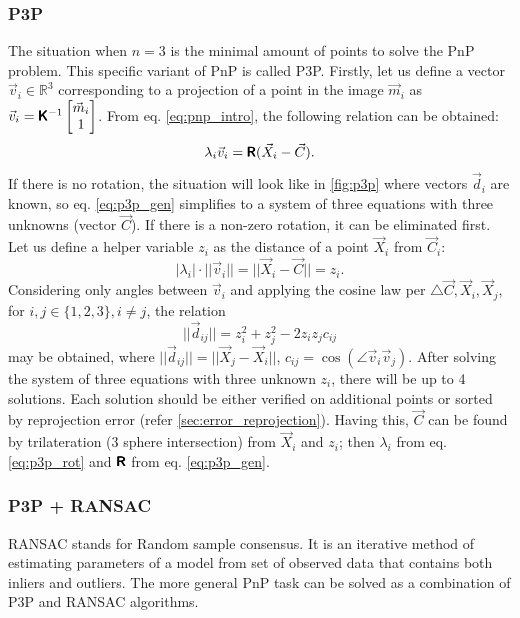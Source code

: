 \subsubsection{P3P}
The situation when $n=3$ is the minimal amount of points to solve the PnP problem.
This specific variant of PnP is called P3P.  
Firstly, let us define a vector $\vec{v}_i \in \mathbb{R}^3$ corresponding to a projection of a point in the image $\vec{m}_i$ as $\vec{v}_i = \pmb{\mathsf{K}}^{-1}\begin{bmatrix}\vec{m}_i \\ 1 \end{bmatrix}$. From eq. \eqref{eq:pnp_intro}, the following relation can be obtained:
\begin{equation}
    \label{eq:p3p_gen}
    \lambda_i \vec{v}_i = \pmb{\mathsf{R}} (\vec{X}_i - \vec{C}).
\end{equation}
If there is no rotation, the situation will look like in \autoref{fig:p3p} where vectors $\vec{d}_i$ are known, so eq. \eqref{eq:p3p_gen} simplifies to a system of three equations with three unknowns (vector $\vec{C}$).
If there is a non-zero rotation, it can be eliminated first.
Let us define a helper variable $z_i$ as the distance of a point $\vec{X}_i$ from $\vec{C}_i$:
\begin{equation}
    \label{eq:p3p_rot}
    |\lambda_i| \cdot ||\vec{v}_i|| = || \vec{X}_i - \vec{C} || = z_i.
\end{equation}
Considering only angles between $\vec{v}_i$ and applying the cosine law per $\triangle{\vec{C}, \vec{X}_i, \vec{X}_j}$, for $i, j \in \{1, 2, 3\}, i \neq j$, the relation
\begin{equation}
    ||\vec{d}_{ij}|| = z_i^2 + z_j^2 - 2z_iz_jc_{ij}
\end{equation}
may be obtained, where $||\vec{d}_{ij}|| = || \vec{X}_j - \vec{X}_i ||$, $c_{ij} = \cos(\angle \vec{v}_i \vec{v}_j)$.
After solving the system of three equations with three unknown $z_i$, there will be up to 4 solutions.
Each solution should be either verified on additional points \cite{Fischler1981} or sorted by reprojection error (refer \autoref{sec:error_reprojection}).
Having this, $\vec{C}$ can be found by trilateration (3 sphere intersection) from $\vec{X}_i$ and $z_i$; then $\lambda_i$ from eq. \eqref{eq:p3p_rot} and $\pmb{\mathsf{R}}$ from eq. \eqref{eq:p3p_gen}.

\subsubsection{P3P + RANSAC}
RANSAC stands for Random sample consensus. 
It is an iterative method of estimating parameters of a model from set of observed data that contains both inliers and outliers.
The more general PnP task can be solved as a combination of P3P and RANSAC algorithms.

